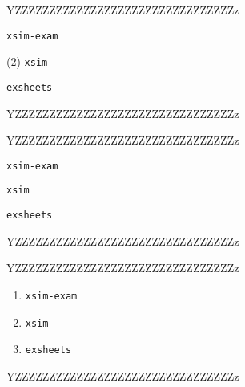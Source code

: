 \documentclass{article}
\begin{document}
YZZZZZZZZZZZZZZZZZZZZZZZZZZZZZZZZz

 \begin{enumext*}[columns=3, columns-sep=1cm,itemsep=23pt, topsep=3cm]
          \item \texttt{xsim-exam}
          \item(2) \texttt{xsim}
          \item \texttt{exsheets}
 \end{enumext*}

YZZZZZZZZZZZZZZZZZZZZZZZZZZZZZZZZz\par
\vspace*{3cm}

YZZZZZZZZZZZZZZZZZZZZZZZZZZZZZZZZz \par

\begin{enumext*}[topsep=5cm, columns=3, columns-sep=1cm,itemsep=23pt]
          \item \texttt{xsim-exam}
          \item \texttt{xsim}
          \item \texttt{exsheets}
\end{enumext*}

YZZZZZZZZZZZZZZZZZZZZZZZZZZZZZZZZz

YZZZZZZZZZZZZZZZZZZZZZZZZZZZZZZZZz \par

\begin{enumerate}[topsep=5cm,itemsep=23pt]
          \item \texttt{xsim-exam}
          \item \texttt{xsim}
          \item \texttt{exsheets}
\end{enumerate}

YZZZZZZZZZZZZZZZZZZZZZZZZZZZZZZZZz
\end{document}
